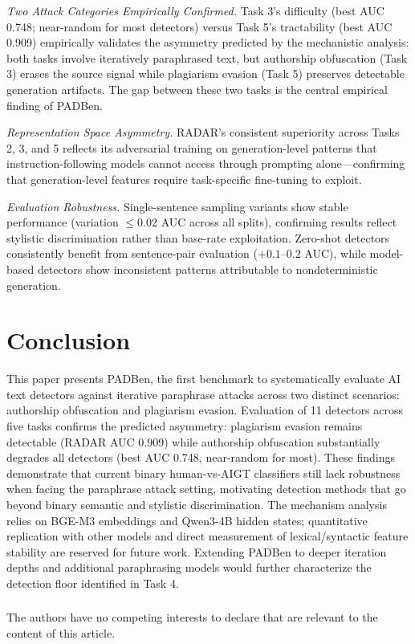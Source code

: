 \documentclass[runningheads]{llncs}
\begin{document}
\noindent\textit{Two Attack Categories Empirically Confirmed.} 
Task 3's difficulty (best AUC 0.748; near-random for most detectors) 
versus Task 5's tractability (best AUC 0.909) empirically validates 
the asymmetry predicted by the mechanistic analysis: both tasks involve 
iteratively paraphrased text, but authorship obfuscation (Task 3) 
erases the source signal while plagiarism evasion (Task 5) preserves 
detectable generation artifacts. The gap between these two tasks is 
the central empirical finding of PADBen.

\noindent\textit{Representation Space Asymmetry.} RADAR's consistent 
superiority across Tasks 2, 3, and 5 reflects its adversarial training 
on generation-level patterns that instruction-following models cannot 
access through prompting alone---confirming that generation-level 
features require task-specific fine-tuning to exploit.

\noindent\textit{Evaluation Robustness.} Single-sentence sampling 
variants show stable performance (variation $\leq 0.02$ AUC across 
all splits), confirming results reflect stylistic discrimination rather 
than base-rate exploitation. Zero-shot detectors consistently benefit 
from sentence-pair evaluation ($+0.1$--$0.2$ AUC), while model-based 
detectors show inconsistent patterns attributable to nondeterministic 
generation.

\section{Conclusion}

This paper presents PADBen, the first benchmark to systematically 
evaluate AI text detectors against iterative paraphrase attacks across 
two distinct scenarios: authorship obfuscation and plagiarism evasion. Evaluation of 11 detectors across five tasks confirms the predicted 
asymmetry: plagiarism evasion remains detectable (RADAR AUC 0.909) 
while authorship obfuscation substantially degrades all detectors 
(best AUC 0.748, near-random for most). These findings demonstrate 
that current binary human-vs-AIGT classifiers still lack robustness when facing the paraphrase attack setting, motivating detection 
methods that go beyond binary semantic and stylistic discrimination. The mechanism analysis relies on BGE-M3 embeddings and Qwen3-4B 
hidden states; quantitative replication with other models and direct 
measurement of lexical/syntactic feature stability are reserved for 
future work. Extending PADBen to deeper iteration depths and additional 
paraphrasing models would further characterize the detection floor 
identified in Task 4.



\begin{credits}
\subsubsection{\discintname}
The authors have no competing interests to declare that are relevant to the content of this article.
\end{credits}
\end{document}
